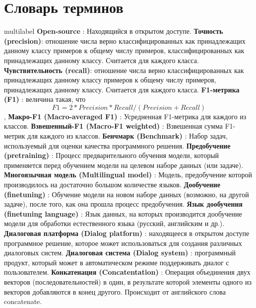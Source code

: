 \chapter*{Словарь терминов}             %
 multilabel  %
\textbf{Open-source} : Находящийся в открытом доступе.
\textbf{Точность (precision)}: отношение числа верно классифицированных как принадлежащих данному классу примеров к общему числу примеров, классифицированных как принадлежащих данному классу. Считается для каждого класса.
\textbf{Чувствительность (recall)}: отношение числа верно классифицированных как принадлежащих данному классу примеров к общему числу примеров, принадлежащих данному классу. Считается для каждого класса.
\textbf{F1-метрика (F1)} : величина такая, что \begin{equation}
F1 = 2*Precision*Recall/(Precision+Recall)
\end{equation},
\textbf{Макро-F1 (Macro-averaged F1)} : Усредненная F1-метрика для каждого из классов.
\textbf{Взвешенный-F1 (Macro-F1 weighted)} : Взвешенная сумма F1-метрик для каждого из классов.
\textbf{Бенчмарк (Benchmark)} : Набор задач, используемый для оценки качества программного решения.
\textbf{Предобучение (pretraining)} : Процесс предварительного обучения модели, который
применяется перед обучением модели на целевом наборе данных (или задаче). 
\textbf{Многоязычная модель (Multilingual model)} : Модель, предобучение которой производилось на достаточно большом количестве языков.
\textbf{Дообучение (finetuning)} : Обучение модели на новом наборе данных (возможно, на другой задаче), после того, как она прошла процесс предобучения.
\textbf{Язык дообучения (finetuning language)} : Язык данных, на которых производится дообучение модели для обработки естественного языка (русский, английским и др.).
\textbf{Диалоговая платформа (Dialog platform)} : находящееся в открытом доступе программное решение, которое может использоваться для создания различных диалоговых систем.
\textbf{Диалоговая система (Dialog system)} : программный продукт, который может в автоматическом режиме поддерживать диалог с пользователем.
\textbf{Конкатенация (Concatentation)} : Операция объединения двух векторов (последовательностей) в один, в результате которой элементы одного из векторов добавляются в конец другого. Происходит от английского слова concatenate.
